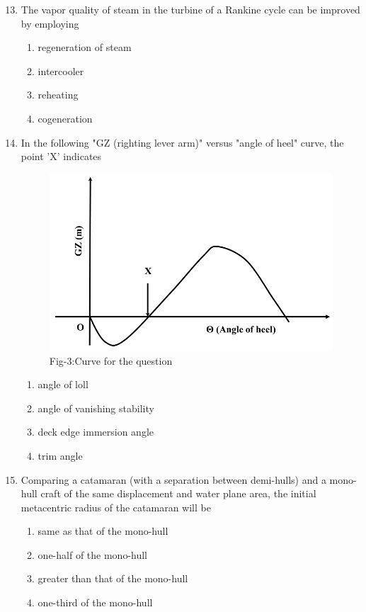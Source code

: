 \documentclass[journal]{IEEEtran}
\theoremstyle{remark}
\begin{document}
\begin{enumerate}[itemsep=1em]
\setcounter{enumi}{12}
\item The vapor quality of steam in the turbine of a Rankine cycle can be improved by employing 

\begin{enumerate}[leftmargin=2.5em, labelsep=0.5em, itemsep=0.5em]
     \item regeneration of steam 
     \item intercooler 
     \item reheating 
     \item cogeneration
\end{enumerate}

\end{enumerate}

\newpage
\vspace*{0.25cm}

\begin{enumerate}[itemsep=1em]
\setcounter{enumi}{13}
\item In the following "GZ (righting lever arm)" versus "angle of heel" curve, the point 'X' indicates
\begin{figure}[H]
    \centering
    \includegraphics[width=0.4\columnwidth]{figs/fig-3.jpeg}
    \caption*{Fig-3:Curve for the question}
    \label{fig-3}
\end{figure}
\begin{enumerate}[leftmargin=2.5em, labelsep=0.5em, itemsep=0.5em]
      \item angle of loll 
      \item angle of vanishing stability 
      \item deck edge immersion angle 
      \item trim angle 
\end{enumerate}
\end{enumerate}

\begin{enumerate}[itemsep=1em]
\setcounter{enumi}{14}
\item Comparing a catamaran (with a separation between demi-hulls) and a mono-hull craft of the same displacement and water plane area, the initial metacentric radius of the catamaran will be 
\begin{enumerate}[leftmargin=2.5em, labelsep=0.5em, itemsep=0.5em]
     \item same as that of the mono-hull 
     \item one-half of the mono-hull 
     \item greater than that of the mono-hull 
     \item one-third of the mono-hull 
\end{enumerate}
\end{enumerate}
\newpage
\vspace*{0.25cm}
\end{document}
